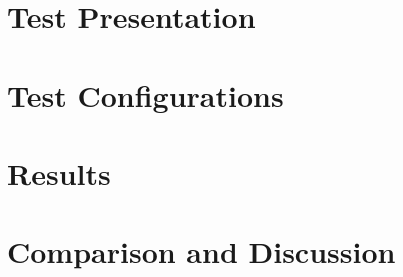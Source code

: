 
\section{Test Presentation}

\section{Test Configurations}

\section{Results}

\section{Comparison and Discussion}
